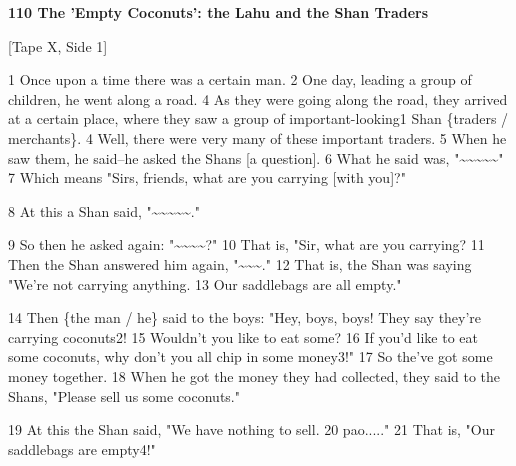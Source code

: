 
\textbf{110 The 'Empty Coconuts': the Lahu and the Shan Traders}

[Tape X, Side 1]

1 Once upon a time there was a certain man. 2 One day, leading a group of children,
he went along a road. 4 As they were going along the road, they arrived at a certain
place, where they saw a group of important-looking1 Shan \{traders / merchants\}.
4 Well, there were very many of these important traders. 5 When he saw them, he
said--he asked the Shans [a question]. 6 What he said was, "\textasciitilde{}\textasciitilde{}\textasciitilde{}\textasciitilde{}\textasciitilde{}"
7 Which means "Sirs, friends, what are you carrying [with you]?"

8 At this a Shan said, "\textasciitilde{}\textasciitilde{}\textasciitilde{}\textasciitilde{}\textasciitilde{}."

9 So then he asked again: "\textasciitilde{}\textasciitilde{}\textasciitilde{}\textasciitilde{}?"
10 That is, "Sir, what are you carrying? 11 Then the Shan answered him
again, "\textasciitilde{}\textasciitilde{}\textasciitilde{}."
12 That is, the Shan was saying "We're not carrying anything. 13 Our saddlebags
are all empty."

14 Then \{the man / he\} said to the boys: "Hey, boys, boys! They say
they're carrying coconuts2! 15 Wouldn't you like to eat some? 16 If you'd like
to eat some coconuts, why don't you all chip in some money3!" 17 So the've
got some money together. 18 When he got the money they had collected, they said
to the Shans, "Please sell us some coconuts."

19 At this the Shan said, "We have nothing to sell. 20 pao....."
21 That is, "Our saddlebags are empty4!"

